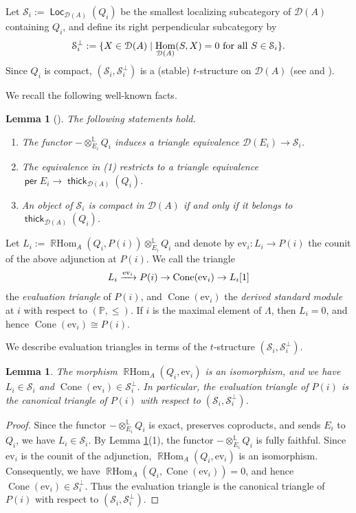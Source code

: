 \documentclass[a4paper,reqno,11pt]{amsart}
\numberwithin{equation}{section}
\newtheorem{lemma}[theorem]{Lemma}
\theoremstyle{definition}
\newcommand{\D}{\mathcal{D}}
\renewcommand{\S}{\mathcal{S}}
\newcommand{\LL}{\mathbb{L}}
\newcommand{\PP}{\mathbb{P}}
\newcommand{\ev}{\mathrm{ev}}
\DeclareMathOperator{\Co}{Cone}
\DeclareMathOperator{\thick}{\mathsf{thick}}
\DeclareMathOperator{\Loc}{\mathsf{Loc}}
\DeclareMathOperator{\per}{\mathsf{per}}
\DeclareMathOperator{\Hom}{Hom}
\DeclareMathOperator{\RHom}{\mathbb{R}Hom}
\begin{document}
Let $\S_{i}:=\Loc_{\D(A)}(Q_{i})$ be the smallest localizing subcategory of $\D(A)$ containing $Q_{i}$, and define its right perpendicular subcategory by
\begin{align}
\S_{i}^{\perp}:=\{X\in\D(A)\mid \Hom_{\D(A)}(S,X)=0
\text{ for all }S\in\S_{i}\}.\notag
\end{align}
Since $Q_{i}$ is compact, $(\S_{i},\S_{i}^{\perp})$ is a (stable) $t$-structure on $\D(A)$ (see \cite[Theorem 5.6.1]{K10} and \cite[Proposition 2.4]{M03}).

We recall the following well-known facts.

\begin{lemma}[{\cite[4.2 and 5.3]{K94}}]\label{lem:tensor_equiv}
The following statements hold.
\begin{enumerate}
\item The functor $-\otimes_{E_{i}}^{\LL}Q_{i}$ induces a triangle equivalence $\D(E_{i})\to\S_{i}$.
\item The equivalence in (1) restricts to a triangle equivalence $\per E_{i}\to\thick_{\D(A)}(Q_{i})$.
\item An object of $\S_{i}$ is compact in $\D(A)$ if and only if it belongs to $\thick_{\D(A)}(Q_{i})$.
\end{enumerate}
\end{lemma}

Let $L_{i}:=\RHom_{A}(Q_{i},P(i))\otimes_{E_{i}}^{\LL}Q_{i}$ and denote by $\ev_{i}:L_{i}\to P(i)$ the counit of the above adjunction at $P(i)$.
We call the triangle
\begin{align}
L_{i}\xrightarrow{\ev_{i}}P(i) \to\Co(\ev_{i})\to L_{i}[1]\notag
\end{align}
the \emph{evaluation triangle} of $P(i)$, and $\Co(\ev_{i})$ the \emph{derived standard module} at $i$ with respect to $(\PP,\leq)$.
If $i$ is the maximal element of $\Lambda$, then $L_{i}=0$, and hence $\Co(\ev_{i})\cong P(i)$.

We describe evaluation triangles in terms of the $t$-structure $(\S_{i},\S_{i}^{\perp})$.

\begin{lemma}\label{lem:ev_canonical}
The morphism $\RHom_{A}(Q_{i},\ev_{i})$ is an isomorphism, and we have $L_{i}\in\S_{i}$ and $\Co(\ev_{i})\in\S_{i}^{\perp}$.
In particular, the evaluation triangle of $P(i)$ is the canonical triangle of $P(i)$ with respect to $(\S_{i},\S_{i}^{\perp})$.
\end{lemma}
\begin{proof}
Since the functor $-\otimes_{E_{i}}^{\LL}Q_{i}$ is exact, preserves coproducts, and sends $E_{i}$ to $Q_{i}$, we have $L_{i}\in\S_{i}$.
By Lemma \ref{lem:tensor_equiv}(1), the functor $-\otimes_{E_{i}}^{\LL}Q_{i}$ is fully faithful.
Since $\ev_{i}$ is the counit of the adjunction, $\RHom_{A}(Q_{i},\ev_{i})$ is an isomorphism.
Consequently, we have $\RHom_{A}(Q_{i},\Co(\ev_{i}))=0$, and hence $\Co(\ev_{i})\in\S_{i}^{\perp}$.
Thus the evaluation triangle is the canonical triangle of $P(i)$ with respect to $(\S_{i},\S_{i}^{\perp})$.
\end{proof}
\end{document}
